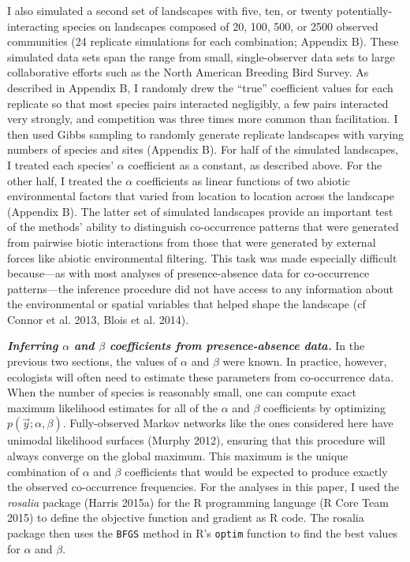 \documentclass[12pt,]{article}
\begin{document}
\begin{spacing}{1.9}
\begin{flushleft}
I also simulated a second set of landscapes with five, ten, or twenty
potentially-interacting species on landscapes composed of 20, 100, 500,
or 2500 observed communities (24 replicate simulations for each
combination; Appendix B). These simulated data sets span the range from
small, single-observer data sets to large collaborative efforts such as
the North American Breeding Bird Survey. As described in Appendix B, I
randomly drew the ``true'' coefficient values for each replicate so that
most species pairs interacted negligibly, a few pairs interacted very
strongly, and competition was three times more common than facilitation.
I then used Gibbs sampling to randomly generate replicate landscapes
with varying numbers of species and sites (Appendix B). For half of the
simulated landscapes, I treated each species' \(\alpha\) coefficient as
a constant, as described above. For the other half, I treated the
\(\alpha\) coefficients as linear functions of two abiotic environmental
factors that varied from location to location across the landscape
(Appendix B). The latter set of simulated landscapes provide an
important test of the methods' ability to distinguish co-occurrence
patterns that were generated from pairwise biotic interactions from
those that were generated by external forces like abiotic environmental
filtering. This task was made especially difficult because---as with
most analyses of presence-absence data for co-occurrence patterns---the
inference procedure did not have access to any information about the
environmental or spatial variables that helped shape the landscape (cf
Connor et al. 2013, Blois et al. 2014).

\textbf{\emph{Inferring \(\alpha\) and \(\beta\) coefficients from
presence-absence data.}} In the previous two sections, the values of
\(\alpha\) and \(\beta\) were known. In practice, however, ecologists
will often need to estimate these parameters from co-occurrence data.
When the number of species is reasonably small, one can compute exact
maximum likelihood estimates for all of the \(\alpha\) and \(\beta\)
coefficients by optimizing \(p(\vec{y}; \alpha, \beta)\). Fully-observed
Markov networks like the ones considered here have unimodal likelihood
surfaces (Murphy 2012), ensuring that this procedure will always
converge on the global maximum. This maximum is the unique combination
of \(\alpha\) and \(\beta\) coefficients that would be expected to
produce exactly the observed co-occurrence frequencies. For the analyses
in this paper, I used the \emph{rosalia} package (Harris 2015a) for the
R programming language (R Core Team 2015) to define the objective
function and gradient as R code. The rosalia package then uses the
\texttt{BFGS} method in R's \texttt{optim} function to find the best
values for \(\alpha\) and \(\beta\).


\end{flushleft}
\end{spacing}
\end{document}
